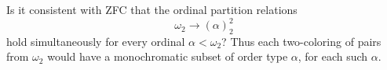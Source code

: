 Is it consistent with ZFC that the ordinal partition relations
\[
\omega_2\longrightarrow(\alpha)^2_2
\]
hold simultaneously for every ordinal $\alpha<\omega_2$? Thus each two-coloring of pairs from $\omega_2$ would have a monochromatic subset of order type $\alpha$, for each such $\alpha$.

